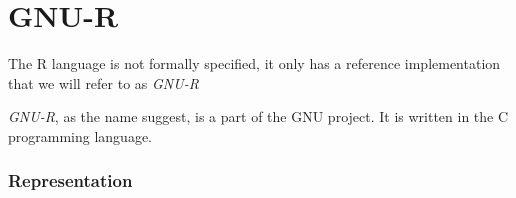 %
%
%

\newpage
\section{GNU-R}

The R language is not formally specified, it only has a reference implementation that we will refer to as \textit{GNU-R}

\textit{GNU-R}, as the name suggest, is a part of the GNU project. It is written in the C programming language. 


\subsubsection*{Representation}

